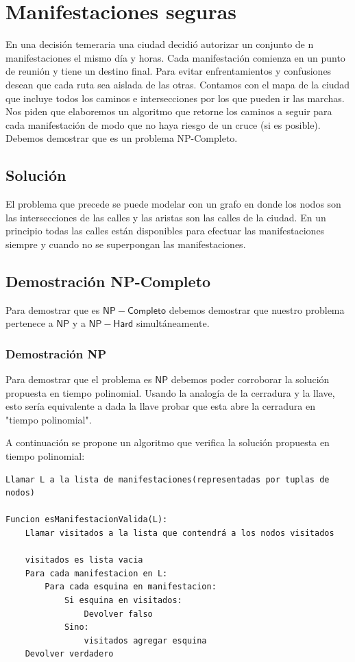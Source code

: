  \section{Manifestaciones seguras}

En una decisión temeraria una ciudad decidió autorizar un conjunto de n manifestaciones el mismo día y horas. Cada manifestación comienza en un punto de reunión y tiene un destino final. Para evitar enfrentamientos y confusiones desean que cada ruta sea aislada de las otras. Contamos con el mapa de la ciudad que incluye todos los caminos e intersecciones por los que pueden ir las marchas. Nos piden que elaboremos un algoritmo que retorne los caminos a seguir para cada manifestación de modo que no haya riesgo de un cruce (si es posible).\newline
Debemos demostrar que es un problema NP-Completo.

\subsection{Solución}
El problema que precede se puede modelar con un grafo en donde los nodos son las intersecciones de las calles y las aristas son las calles de la ciudad. En un principio todas las calles están disponibles para efectuar las manifestaciones siempre y cuando no se superpongan las manifestaciones.

\subsection{Demostración NP-Completo}
Para demostrar que es $\mathsf{NP-Completo}$ debemos demostrar que nuestro problema pertenece a $\mathsf{NP}$ y a $\mathsf{NP-Hard}$ simultáneamente.

\subsubsection{Demostración NP}
Para demostrar que el problema es $\mathsf{NP}$ debemos poder corroborar la solución propuesta en tiempo polinomial. Usando la analogía de la cerradura y la llave, esto sería equivalente a dada la llave probar que esta abre la cerradura en "tiempo polinomial". \newline

A continuación se propone un algoritmo que verifica la solución propuesta en tiempo polinomial:

\begin{verbatim}
Llamar L a la lista de manifestaciones(representadas por tuplas de nodos)

Funcion esManifestacionValida(L):
    Llamar visitados a la lista que contendrá a los nodos visitados
    
    visitados es lista vacia
    Para cada manifestacion en L:
        Para cada esquina en manifestacion:
            Si esquina en visitados:
                Devolver falso
            Sino:
                visitados agregar esquina
    Devolver verdadero
\end{verbatim}

